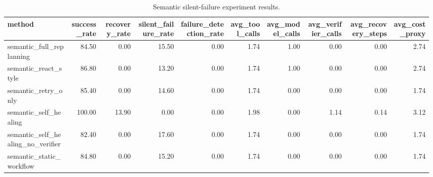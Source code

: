 \begin{table}
\caption{Semantic silent-failure experiment results.}
\label{tab:semantic_silent_failure}
\begin{tabular}{lrrrrrrrrr}
\toprule
method & success_rate & recovery_rate & silent_failure_rate & failure_detection_rate & avg_tool_calls & avg_model_calls & avg_verifier_calls & avg_recovery_steps & avg_cost_proxy \\
\midrule
semantic_full_replanning & 84.50 & 0.00 & 15.50 & 0.00 & 1.74 & 1.00 & 0.00 & 0.00 & 2.74 \\
semantic_react_style & 86.80 & 0.00 & 13.20 & 0.00 & 1.74 & 1.00 & 0.00 & 0.00 & 2.74 \\
semantic_retry_only & 85.40 & 0.00 & 14.60 & 0.00 & 1.74 & 0.00 & 0.00 & 0.00 & 1.74 \\
semantic_self_healing & 100.00 & 13.90 & 0.00 & 0.00 & 1.98 & 0.00 & 1.14 & 0.14 & 3.12 \\
semantic_self_healing_no_verifier & 82.40 & 0.00 & 17.60 & 0.00 & 1.74 & 0.00 & 0.00 & 0.00 & 1.74 \\
semantic_static_workflow & 84.80 & 0.00 & 15.20 & 0.00 & 1.74 & 0.00 & 0.00 & 0.00 & 1.74 \\
\bottomrule
\end{tabular}
\end{table}
